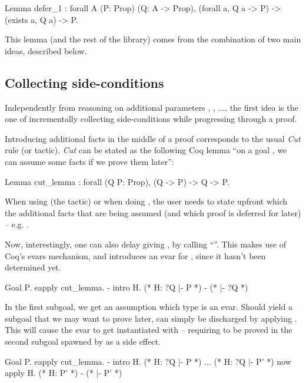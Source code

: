 \documentclass[xetex,format=acmlarge,screen=true,authorversion=true]{acmart-modified}
\begin{document}
\begin{coq}
  Lemma defer_1 : forall A (P: Prop) (Q: A -> Prop),
    (forall a, Q a -> P) ->
    (exists a, Q a) ->
    P.
\end{coq}

This lemma (and the rest of the library) comes from the combination of two main
ideas, described below.

\subsection{Collecting side-conditions}

Independently from reasoning on additional parameters , , ...,
the first idea is the one of incrementally collecting side-conditions while
progressing through a proof.

Introducing additional facts in the middle of a proof corresponds to the usual
\emph{Cut} rule (or  tactic). \emph{Cut} can be stated as the following
Coq lemma ``on a goal , we can assume some facts  if we prove them
later'':

\begin{coq}
  Lemma cut_lemma : forall (Q P: Prop), (Q -> P) -> Q -> P.
\end{coq}

When using  (the tactic) or when doing , the user
needs to state upfront which the additional facts  that are being assumed
(and which proof is deferred for later) -- e.g. .

Now, interestingly, one can also delay giving , by calling ``''. This makes use of Coq's evars mechanism, and introduces an evar
for , since it hasn't been determined yet.

\begin{coq}
  Goal P.
    eapply cut_lemma.
    - intro H.
      (* H: ?Q |- P *)
    - (* |- ?Q *)
\end{coq}

In the first subgoal, we get an assumption  which type is an evar. Should
 yield a subgoal  that we may want to prove later,  can
simply be discharged by applying . This will cause the evar  to get
instantiated with  -- requiring  to be proved in the second
subgoal spawned by  as a side effect.

\begin{coq}
  Goal P.
    eapply cut_lemma.
    - intro H.
      (* H: ?Q |- P *)
      ...
      (* H: ?Q |- P' *)
      now apply H.
      (* H: P' *)
    - (* |- P' *)
\end{coq}
\end{document}
